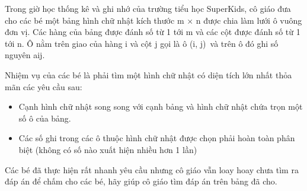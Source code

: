 Trong giờ học thống kê và ghi nhớ của trường tiểu học SuperKids, cô giáo đưa cho các bé một bảng hình chữ nhật kích thước m × n được chia làm lưới ô vuông đơn vị. Các hàng của bảng được đánh số từ 1 tới m và các cột được đánh số từ 1 tới n. Ô nằm trên giao của hàng i và cột j gọi là ô (i, j) và trên ô đó ghi số nguyên aij.

Nhiệm vụ của các bé là phải tìm một hình chữ nhật có diện tích lớn nhất thỏa mãn các yêu cầu sau:
\begin{itemize}
	\item Cạnh hình chữ nhật song song với cạnh bảng và hình chữ nhật chứa trọn một số ô của bảng.
	\item Các số ghi trong các ô thuộc hình chữ nhật được chọn phải hoàn toàn phân biệt (không có số nào xuất hiện nhiều hơn 1 lần)
\end{itemize}

Các bé đã thực hiện rất nhanh yêu cầu nhưng cô giáo vẫn loay hoay chưa tìm ra đáp án để chấm cho các bé, hãy giúp cô giáo tìm đáp án trên bảng đã cho.